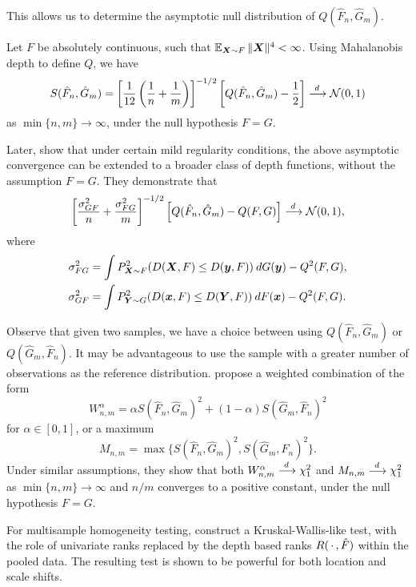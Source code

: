 This allows us to determine the asymptotic null distribution of $Q(\hat{F}_n,
\hat{G}_m)$.

\begin{theorem}
    Let $F$ be absolutely continuous, such that $\operatorname{\mathbb{E}}_{\bm{X} \sim F} \Vert \bm{X} \Vert^4
    < \infty$.
    Using Mahalanobis depth to define $Q$, we have
    \begin{equation}
        S(\hat{F}_n, \hat{G}_m) = \left[\frac{1}{12}\left(\frac{1}{n} + \frac{1}{m}\right)\right]^{-1/2} \left[Q(\hat{F}_n, \hat{G}_m) - \frac{1}{2}\right] \overset{d\,}{\longrightarrow} \mathcal{N}(0, 1)
    \end{equation}
    as $\min\{n, m\} \to \infty$, under the null hypothesis $F = G$.
\end{theorem}

Later, \textcite{zuo-he-2006} show that under certain mild regularity
conditions, the above asymptotic convergence can be extended to a broader
class of depth functions, without the assumption $F = G$.
They demonstrate that
\begin{equation}
    \left[\frac{\sigma_{GF}^2}{n} + \frac{\sigma_{FG}^2}{m}\right]^{-1/2} \left[Q(\hat{F}_n, \hat{G}_m) - Q(F, G)\right] \overset{d\,}{\longrightarrow} \mathcal{N}(0, 1),
\end{equation}
where
\begin{align}
    \sigma_{FG}^2 &= \int P^2_{\bm{X} \sim F}(D(\bm{X}, F) \leq D(\bm{y}, F)) \:dG(\bm{y}) - Q^2(F, G), \\
    \sigma_{GF}^2 &= \int P^2_{\bm{Y} \sim G}(D(\bm{x}, F) \leq D(\bm{Y}, F)) \:dF(\bm{x}) - Q^2(F, G).
\end{align}

Observe that given two samples, we have a choice between using $Q(\hat{F}_n,
\hat{G}_m)$ or $Q(\hat{G}_m, \hat{F}_n)$.
It may be advantageous to use the sample with a greater number of observations
as the reference distribution.
\textcite{shi-zhang-fu-2023} propose a weighted combination of the form
\begin{equation}
    W^\alpha_{n, m} = \alpha S(\hat{F}_n, \hat{G}_m)^2 + (1 - \alpha) S(\hat{G}_m, \hat{F}_n)^2
\end{equation}
for $\alpha \in [0, 1]$, or a maximum
\begin{equation}
    M_{n, m} = \max\{S(\hat{F}_n, \hat{G}_m)^2, S(\hat{G}_m, \hat{F}_n)^2\}.
\end{equation}
Under similar assumptions, they show that both $W^\alpha_{n, m} \overset{d\,}{\longrightarrow} \chi^2_1$
and $M_{n, m} \overset{d\,}{\longrightarrow} \chi^2_1$ as $\min\{n, m\} \to \infty$ and $n / m$
converges to a positive constant, under the null hypothesis $F = G$.

For multisample homogeneity testing, \textcite{chenouri-small-2012} construct
a Kruskal-Wallis-like test, with the role of univariate ranks replaced by the
depth based ranks $R(\,\cdot\,, \hat{F})$ within the pooled data.
The resulting test is shown to be powerful for both location and scale shifts.

